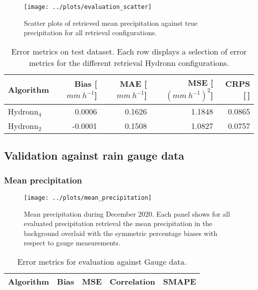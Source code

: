 \documentclass[journal abbreviation, manuscript]{copernicus}
\newcommand{\hydronntwo}{Hydronn$_{2}$}
\newcommand{\hydronnfourall}{Hydronn$_{4}$}
\begin{document}
{\begin{figure}
  \centering
  \texttt{[image: ../plots/evaluation\_scatter]}
  \caption{
    Scatter plots of retrieved mean precipitation against true precipitation
    for all retrieval configurations.
    }
  \label{fig:evaluation_scatter}
\end{figure}


\begin{table}
  \caption{Error metrics on test dataset. Each row displays a selection of error
     metrics for the different retrieval Hydronn configurations.}
  \label{tab:evaluation_metrics}
\begin{tabular}{l|rrrr}
  Algorithm & Bias [$\unit{mm\ h^{-1}}$] & MAE [$\unit{mm\ h^{-1}}$] & MSE [$\unit{(mm\ h^{-1})^{2}}$]& CRPS [$\ $] \\
  \hline
  \hydronnfourall & 0.0006 & 0.1626 & 1.1848 & 0.0865 \\
  \hydronntwo & -0.0001 & 0.1508 & 1.0827 & 0.0757 \\
 \end{tabular} 
\end{table}
 



\subsection{Validation against rain gauge data}

\subsubsection{Mean precipitation}
\begin{figure}
  \centering
  \texttt{[image: ../plots/mean\_precipitation]}
  \caption{
    Mean precipitation during December 2020. Each panel shows for all evaluated
    precipitation retrieval the mean precipitation in the background overlaid
    with the symmetric percentage biases with respect to gauge measurements.
    }
  \label{fig:evaluation_scatter}
\end{figure}



\begin{table}
  \caption{Error metrics for evaluation against Gauge data.}
  \label{tab:metrics}
\begin{tabular}{|l||r|r|r|r|}
\hline
  Algorithm & Bias & MSE & Correlation & SMAPE \\
\hline
\hline


\end{tabular}
\end{table}}
\end{document}
